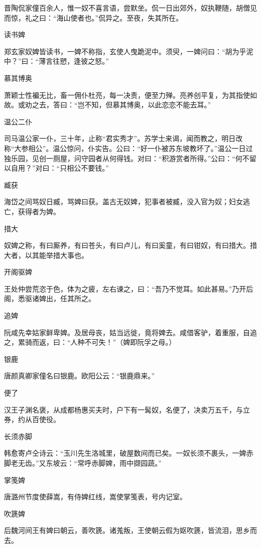 \documentclass[a4paper,12pt,UTF8,twoside]{ctexbook}
\begin{document}
    晋陶侃家僮百余人，惟一奴不喜言语，尝默坐。侃一日出郊外，奴执鞭随，胡僧见而惊，礼之曰：“海山使者也。”侃异之。至夜，失其所在。
    
    读书婢
    
    郑玄家奴婢皆读书，一婢不称指，玄使人曳跪泥中。须臾，一婢问曰：“胡为乎泥中？”曰：“薄言往愬，逢彼之怒。”
    
    慕其博奥
    
    萧颖士性褊无比，畜一佣仆杜亮，每一决责，便至力殚。亮养创平复，为其指使如故。或劝之去，答曰：“岂不知，但慕其博奥，以此恋恋不能去耳。”
    
    温公二仆
    
    司马温公家一仆，三十年，止称“君实秀才”。苏学士来谒，闻而教之，明日改称“大参相公”。温公惊问，仆实告。公曰：“好一仆被苏东坡教坏了。”温公一日过独乐园，见创一厕屋，问守园者从何得钱。对曰：“积游赏者所得。”公曰：“何不留以自用？”对曰：“只相公不要钱。”
    
    臧获
    
    海岱之间骂奴日臧，骂婢曰获。盖古无奴婢，犯事者被臧，没入官为奴；妇女逃亡，获得者为婢。
    
    措大
    
    奴婢之称，有曰厮养，有曰苍头，有曰卢儿，有曰奚童，有曰钳奴，有曰措大。措大者，以其能举措大事也。
    
    开阁驱婢
    
    王处仲尝荒恣于色，体为之疲，左右谏之，曰：“吾乃不觉耳。如此甚易。”乃开后阁，悉驱诸婢出，任其所之。
    
    追婢
    
    阮咸先幸姑家鲜卑婢。及居母丧，姑当远徙，竟将婢去。咸借客驴，着重服，自追之，累骑而返，曰：“人种不可失！”（婢即阮孚之母。）
    
    银鹿
    
    唐颜真卿家僮名曰银鹿。欧阳公云：“银鹿鼎来。”
    
    便了
    
    汉王子渊名褒，从成都杨惠买夫时，户下有一髯奴，名便了，决卖万五千，与立券，约从百使役。
    
    长须赤脚
    
    韩愈寄卢仝诗云：“玉川先生洛城里，破屋数间而已矣。一奴长须不裹头，一婢赤脚老无齿。”又东坡云：“常呼赤脚婢，雨中撷园蔬。”
    
    掌笺婢
    
    唐潞州节度使薛嵩，有侍婢红线，嵩使掌笺表，号内记室。
    
    吹篪婢
    
    后魏河间王有婢曰朝云，善吹篪。诸羗叛，王使朝云假为妪吹篪，皆流泪，思乡而去。
    
\end{document}
